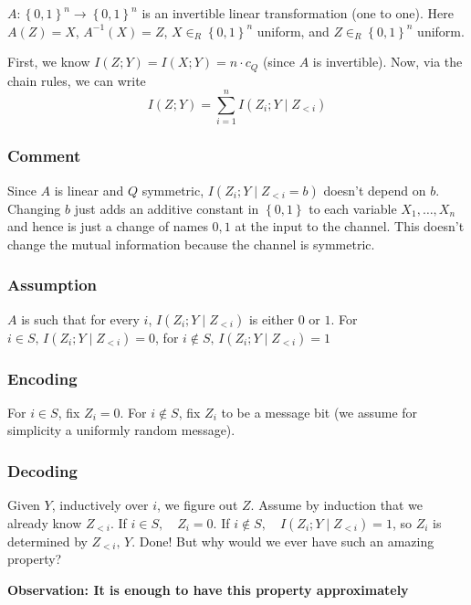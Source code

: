 \documentclass{article}
\begin{document}
$A:\left\{0,1\right\}^n\to\left\{0,1\right\}^n$ is an invertible linear transformation (one to one). Here $A(Z)=X$, $A^{-1}(X)=Z$, $X\in_R \left\{0,1\right\}^n$ uniform, and $Z\in_R\left\{0,1\right\}^n$ uniform.

First, we know $I(Z;Y)=I(X;Y)=n\cdot c_Q$ (since $A$ is invertible). Now, via the chain rules, we can write 
\[
I(Z;Y) = \sum_{i=1 }^{n }I(Z_i; Y \mid Z_{<i})
\]

\subsubsection{Comment}

Since $A$ is linear and $Q$ symmetric, $I(Z_i;Y\mid Z_{<i}=b)$ doesn't depend on $b$. Changing $b$ just adds an additive constant in $\left\{0,1\right\}$ to each variable $X_1,\ldots,X_n$ and hence is just a change of names $0,1$ at the input to the channel. This doesn't change the mutual information because the channel is symmetric.

\subsubsection{Assumption}
$A$ is such that for every $i$, $I(Z_i; Y \mid Z_{<i})$ is either $0$ or $1$. For $i\in S, \, I(Z_i; Y \mid Z_{<i})=0$, for $i\notin S,\, I(Z_i; Y \mid Z_{<i})=1$

\subsubsection{Encoding}

For $i\in S$, fix $Z_i = 0$. For $i\notin S$, fix $Z_i$ to be a message bit (we assume for simplicity a uniformly random message).

\subsubsection{Decoding}

Given $Y$, inductively over $i$, we figure out $Z$. Assume by induction that we already know $Z_{<i}$. If $i\in S,\quad Z_i=0$. If $i\notin S,\quad I(Z_i; Y\mid Z_{< i})=1$, so $Z_i$ is determined by $Z_{<i},\, Y$. Done! But why would we ever have such an amazing property?

\textbf{Observation: It is enough to have this property approximately}
\end{document}
